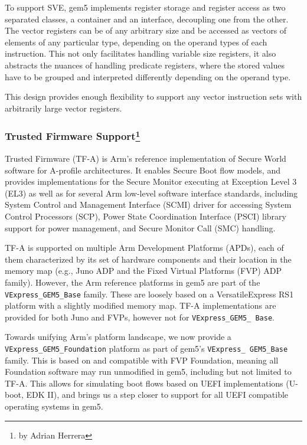 To support SVE, gem5 implements register storage and register access
as two separated classes, a container and an interface, decoupling one from the
other. The vector registers can be of any arbitrary size and be accessed as
vectors of elements of any particular type, depending on the operand types of
each instruction. This not only facilitates handling variable size registers,
it also abstracts the nuances of handling predicate registers, where the stored
values have to be grouped and interpreted differently depending on the operand
type.

This design provides enough flexibility to support any vector instruction sets
with arbitrarily large vector registers.

\subsubsection[Trusted Firmware Support]{Trusted Firmware Support\footnote{by Adrian Herrera}}

Trusted Firmware (TF-A) is Arm's reference implementation of Secure World software for A-profile architectures.
It enables Secure Boot flow models, and provides implementations for the Secure Monitor executing at Exception Level 3 (EL3) as well as for several Arm low-level software interface standards, including System Control and Management Interface (SCMI) driver for accessing System Control Processors (SCP), Power State Coordination Interface (PSCI) library support for power management, and Secure Monitor Call (SMC) handling.

TF-A is supported on multiple Arm Development Platforms (APDs), each of them characterized by its set of hardware components and their location in the memory map (e.g., Juno ADP and the Fixed Virtual Platforms (FVP) ADP family).
However, the Arm reference platforms in gem5 are part of the \lstinline|VExpress_GEM5_Base| family.
These are loosely based on a Versatile\texttrademark Express RS1 platform with a slightly modified memory map. TF-A implementations are provided for both Juno and FVPs, however not for \lstinline[breaklines,breakatwhitespace]|VExpress_GEM5_ Base|.

Towards unifying Arm's platform landscape, we now provide a \lstinline|VExpress_GEM5_Foundation| platform as part of gem5's \lstinline[breaklines,breakatwhitespace]|VExpress_ GEM5_Base| family.
This is based on and compatible with FVP Foundation, meaning all Foundation software may run unmodified in gem5, including but not limited to TF-A.
This allows for simulating boot flows based on UEFI implementations (U-boot, EDK II), and brings us a step closer to support for all UEFI compatible operating systems in gem5.
